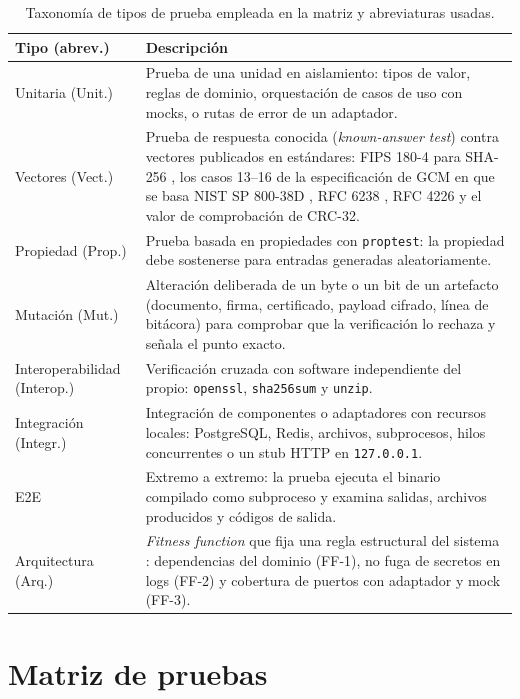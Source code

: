 \begin{table}[H]
  \centering
  \caption{Taxonomía de tipos de prueba empleada en la matriz y abreviaturas usadas.}
  \label{tab:matriz-tipos}
  \begin{tabularx}{\linewidth}{@{}L{3.4cm} X@{}}
    \toprule
    \textbf{Tipo (abrev.)} & \textbf{Descripción} \\
    \midrule
    Unitaria (Unit.) & Prueba de una unidad en aislamiento: tipos de valor, reglas de dominio, orquestación de casos de uso con mocks, o rutas de error de un adaptador. \\
    Vectores (Vect.) & Prueba de respuesta conocida (\emph{known-answer test}) contra vectores publicados en estándares: FIPS 180-4 para SHA-256 \cite{nist2015fips1804}, los casos 13--16 de la especificación de GCM en que se basa NIST SP 800-38D \cite{dworkin2007}, RFC 6238 \cite{mraihi2011}, RFC 4226 \cite{mraihi2005} y el valor de comprobación de CRC-32. \\
    Propiedad (Prop.) & Prueba basada en propiedades con \texttt{proptest}: la propiedad debe sostenerse para entradas generadas aleatoriamente. \\
    Mutación (Mut.) & Alteración deliberada de un byte o un bit de un artefacto (documento, firma, certificado, payload cifrado, línea de bitácora) para comprobar que la verificación lo rechaza y señala el punto exacto. \\
    Interoperabilidad (Interop.) & Verificación cruzada con software independiente del propio: \texttt{openssl}, \texttt{sha256sum} y \texttt{unzip}. \\
    Integración (Integr.) & Integración de componentes o adaptadores con recursos locales: PostgreSQL, Redis, archivos, subprocesos, hilos concurrentes o un stub HTTP en \texttt{127.0.0.1}. \\
    E2E & Extremo a extremo: la prueba ejecuta el binario compilado como subproceso y examina salidas, archivos producidos y códigos de salida. \\
    Arquitectura (Arq.) & \emph{Fitness function} que fija una regla estructural del sistema \cite{ford2023}: dependencias del dominio (FF-1), no fuga de secretos en logs (FF-2) y cobertura de puertos con adaptador y mock (FF-3). \\
    \bottomrule
  \end{tabularx}
\end{table}

\section{Matriz de pruebas}\label{sec:matriz-tabla}

